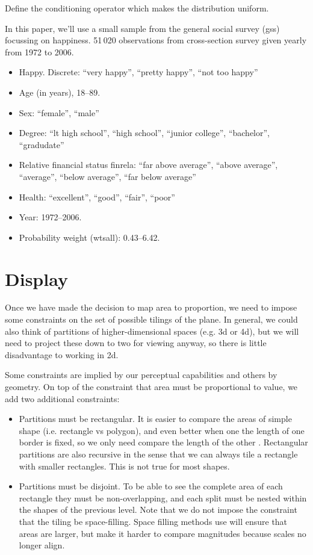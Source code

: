 \documentclass[letterpaper,oneside]{scrartcl}
\begin{document}
Define the conditioning operator which makes the distribution uniform.  

In this paper, we'll use a small sample from the general social survey ({\sc gss}) focussing on happiness. 51\,020 observations from cross-section survey given yearly from 1972 to 2006.

\begin{itemize}
  \item Happy.  Discrete: ``very happy'', ``pretty happy'', ``not too happy''
  \item Age (in years), 18--89.
  \item Sex: ``female'', ``male''
  \item Degree: ``lt high school'', ``high school'', ``junior college'', ``bachelor'', ``gradudate''
  \item Relative financial status {\sf finrela}: ``far above average'', ``above average'', ``average'', ``below average'', ``far below average''
  \item Health: ``excellent'', ``good'', ``fair'', ``poor''
  \item Year: 1972--2006.
  \item Probability weight ({\sf wtsall}): 0.43--6.42.
\end{itemize}


\section{Display}
\label{sec:display}

Once we have made the decision to map area to proportion, we need to impose some constraints on the set of possible tilings of the plane. In general, we could also think of partitions of higher-dimensional spaces (e.g. 3d or 4d), but we will need to project these down to two for viewing anyway, so there is little disadvantage to working in 2d.

Some constraints are implied by our perceptual capabilities and others by geometry. On top of the constraint that area must be proportional to value, we add two additional constraints:

\begin{itemize}

  \item Partitions must be rectangular. It is easier to compare the areas of simple shape (i.e. rectangle vs polygon), and even better when one the length of one border is fixed, so we only need compare the length of the other \citep{cleveland:1984}. Rectangular partitions are also recursive in the sense that we can always tile a rectangle with smaller rectangles. This is not true for most shapes.

  \item Partitions must be disjoint. To be able to see the complete area of each rectangle they must be non-overlapping, and each split must be nested within the shapes of the previous level. Note that we do not impose the constraint that the tiling be space-filling. Space filling methods use will ensure that areas are larger, but make it harder to compare magnitudes because scales no longer align.

\end{itemize}
\end{document}
